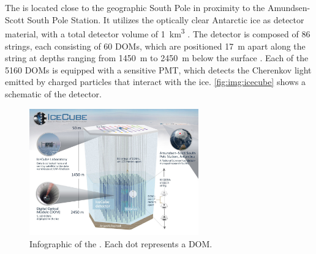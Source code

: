 \section{\icecube{}}
The \icecubeneutrinoobservatory{} is located close to the geographic South Pole
  in proximity to the Amundsen-Scott South Pole Station.
It utilizes the optically clear Antarctic ice as detector material,
  with a total detector volume of \SI{1}{\cubic\kilo\meter} \cite{icecube_aartsen}.
The detector is composed of \num{86} strings,
  each consisting of \num{60} \acp{DOM},
    which are positioned
      \SI{17}{\meter} apart along the string
      at depths ranging from \SI{1450}{\meter} to \SI{2450}{\meter} below the surface \cite{icecube_aartsen}.
Each of the \num{5160} \acp{DOM} is equipped with a sensitive \ac{PMT},
  which detects the Cherenkov light emitted by charged particles
    that interact with the ice.
%
\autoref{fig:img:icecube} shows a schematic of the \icecube{} detector.



\begin{figure}
  \centering
  \includegraphics[width=0.65\textwidth]{content/img/icecube_detector_schematic.jpg}
  \caption{
    Infographic
    of the \icecubeneutrinoobservatory{} \cite{icecube_homepage}.
    Each dot represents a \ac{DOM}.
  }
  \label{fig:img:icecube}
\end{figure}



